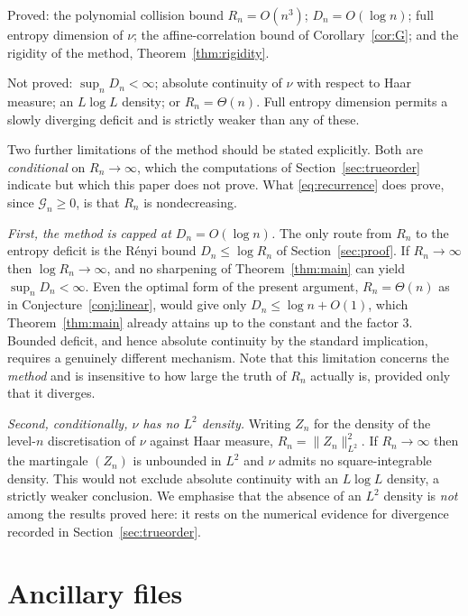 \documentclass[11pt,reqno]{amsart}
\theoremstyle{plain}
\theoremstyle{definition}
\theoremstyle{remark}
\begin{document}
Proved: the polynomial collision bound $R_n=O(n^3)$; $D_n=O(\log n)$; full
entropy dimension of $\nu$; the affine-correlation bound of
Corollary~\ref{cor:G}; and the rigidity of the method,
Theorem~\ref{thm:rigidity}.

Not proved: $\sup_nD_n<\infty$; absolute continuity of $\nu$ with respect
to Haar measure; an $L\log L$ density; or $R_n=\Theta(n)$. Full entropy
dimension permits a slowly diverging deficit and is strictly weaker than
any of these.

Two further limitations of the method should be stated explicitly. Both are
\emph{conditional} on $R_n\to\infty$, which the computations of
Section~\ref{sec:trueorder} indicate but which this paper does not prove.
What \eqref{eq:recurrence} does prove, since $\mathcal G_n\ge0$, is that
$R_n$ is nondecreasing.

\emph{First, the method is capped at $D_n=O(\log n)$.} The only route from
$R_n$ to the entropy deficit is the R\'enyi bound $D_n\le\log R_n$ of
Section~\ref{sec:proof}. If $R_n\to\infty$ then $\log R_n\to\infty$, and no
sharpening of Theorem~\ref{thm:main} can yield $\sup_nD_n<\infty$. Even the
optimal form of the present argument, $R_n=\Theta(n)$ as in
Conjecture~\ref{conj:linear}, would give only $D_n\le\log n+O(1)$, which
Theorem~\ref{thm:main} already attains up to the constant and the factor
$3$. Bounded deficit, and hence absolute continuity by the standard
implication, requires a genuinely different mechanism. Note that this
limitation concerns the \emph{method} and is insensitive to how large the
truth of $R_n$ actually is, provided only that it diverges.

\emph{Second, conditionally, $\nu$ has no $L^2$ density.} Writing $Z_n$ for
the density of the level-$n$ discretisation of $\nu$ against Haar measure,
$R_n=\|Z_n\|_{L^2}^2$. If $R_n\to\infty$ then the martingale $(Z_n)$ is
unbounded in $L^2$ and $\nu$ admits no square-integrable density. This
would not exclude absolute continuity with an $L\log L$ density, a strictly
weaker conclusion. We emphasise that the absence of an $L^2$ density is
\emph{not} among the results proved here: it rests on the numerical
evidence for divergence recorded in Section~\ref{sec:trueorder}.

\appendix

\section{Ancillary files}\label{app:anc}
\end{document}
